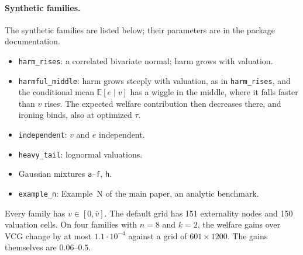 \documentclass[11pt]{article}
\newcommand{\code}[1]{\texttt{#1}}
\begin{document}
\paragraph{Synthetic families.} The synthetic families are listed below; their parameters are in the package documentation.
\begin{itemize}
    \item \code{harm\_rises}: a correlated bivariate normal; harm grows with valuation.
    \item \code{harmful\_middle}: harm grows steeply with valuation, as in \code{harm\_rises}, and the conditional mean $\mathbb{E}[e\mid v]$ has a wiggle in the middle, where it falls faster than $v$ rises. The expected welfare contribution then decreases there, and ironing binds, also at optimized $\tau$.
    \item \code{independent}: $v$ and $e$ independent.
    \item \code{heavy\_tail}: lognormal valuations.
    \item Gaussian mixtures \code{a}--\code{f}, \code{h}.
    \item \code{example\_n}: Example~N of the main paper, an analytic benchmark.
\end{itemize}
Every family has $v\in[0,\bar v]$. The default grid has 151 externality nodes and 150 valuation cells. On four families with $n=8$ and $k=2$, the welfare gains over VCG change by at most $1.1\cdot10^{-4}$ against a grid of $601\times1200$. The gains themselves are $0.06$--$0.5$.
\end{document}
